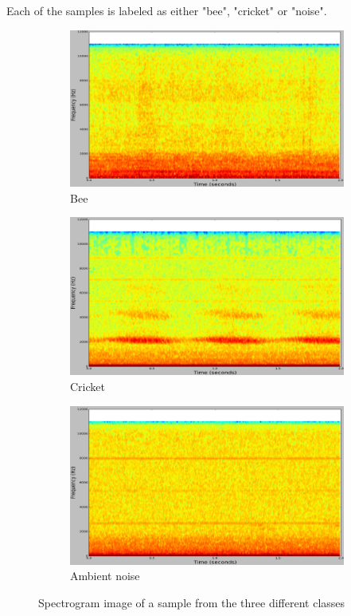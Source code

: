 \documentclass[a4paper]{article}
\begin{document}
Each of the samples is labeled as either "bee", "cricket" or "noise".

\begin{figure}[!ht]
  \centering
  \begin{subfigure}[b]{0.32\textwidth}
    \includegraphics[width=\textwidth]{Images/spect_bee.png}
    \caption{Bee}
  \end{subfigure}
  \begin{subfigure}[b]{0.32\textwidth}
    \includegraphics[width=\textwidth]{Images/spect_cricket.png}
    \caption{Cricket}
  \end{subfigure}
  \begin{subfigure}[b]{0.32\textwidth}
    \includegraphics[width=\textwidth]{Images/spect_noise.png}
    \caption{Ambient noise}
  \end{subfigure}
  \caption{Spectrogram image of a sample from the three different classes \cite{Kulyukin}}
  \label{fig:spect}
\end{figure}
\end{document}
